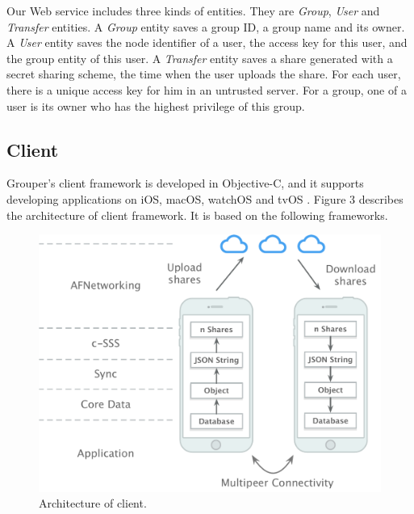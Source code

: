 \documentclass[twocolumn,10pt]{article}
\begin{document}
Our Web service includes three kinds of entities. 
They are \emph{Group}, \emph{User} and \emph{Transfer} entities. 
A \emph{Group} entity saves a group ID, a group name and its owner. 
A \emph{User} entity saves the node identifier of a user, the access key for this user, and the group entity of this user. 
A \emph{Transfer} entity saves a share generated with a secret sharing scheme, the time when the user uploads the share. 
For each user, there is a unique access key for him in an untrusted server. For a group, one of a user is its owner who has the highest privilege of this group.

\subsection{Client}

Grouper's client framework is developed in Objective-C, and it supports developing applications on iOS, macOS, watchOS and tvOS . 
Figure 3 describes the architecture of client framework. It is based on the following frameworks.   

\begin{figure}[t]
	\centering
	\includegraphics[scale=0.36]{architecture}
	\caption{Architecture of client.}
\end{figure}
\end{document}
